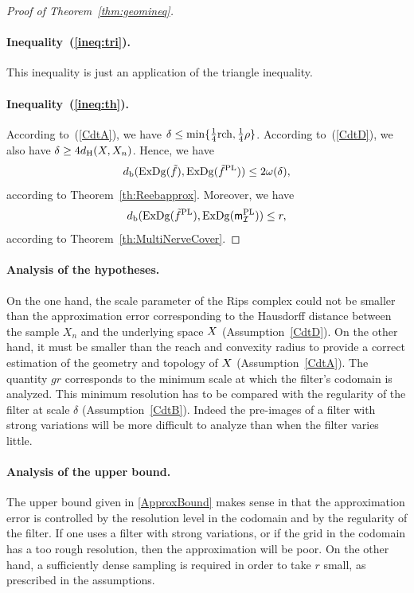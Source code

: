 \begin{proof}[Proof of Theorem~\ref{thm:geomineq}]
\paragraph*{Inequality~(\ref{ineq:tri}).}
This inequality is just an application of the triangle inequality.

\paragraph*{Inequality~(\ref{ineq:th}).}
According to~(\ref{CdtA}), we have %
$\delta \leq \min\{\frac 14 {\rm rch},\frac 14 \rho\}$. 
According to~(\ref{CdtD}), we also have $\delta\geq 4 d_{\rm H}(X,X_n)$.
Hence, we have 
$$d_{\rm b}(\mathrm{ExDg}(\tilde{f}),\mathrm{ExDg}({\tilde{f}}^{\rm PL}))\leq 2 \omega(\delta),$$ %
according to Theorem~\ref{th:Reebapprox}.
Moreover, we have 
$$\dper(  \Dg( \frips{\freeb{f}} ), %
\Dg( \fRPLMtel ) )\leq r,$$ %
according to Theorem~\ref{th:MultiNerveCover}.

\end{proof}

\paragraph{Analysis of the hypotheses.}
On the one hand, the scale parameter of the Rips complex could not be smaller than the approximation error corresponding to 
the Hausdorff distance between the sample $X_n$ and the underlying space $X$ (Assumption~\eqref{CdtD}). 
On the other hand, it must be smaller than the reach and convexity radius to provide a correct estimation of 
the geometry and topology of $X$ (Assumption~\eqref{CdtA}). 
The quantity $g r$ corresponds to the minimum scale at which the filter's codomain is analyzed. This minimum resolution 
has to be compared with the regularity of the filter at scale $\delta$ (Assumption~\eqref{CdtB}). Indeed the pre-images of a filter with 
strong variations will be more difficult to analyze than when the filter varies little. 

\paragraph{Analysis of the upper bound.} The upper bound given in \eqref{ApproxBound} makes sense in that the 
approximation error is controlled by the resolution level in the 
codomain and by the regularity of the filter. If one uses a filter with strong variations, or if the grid in the codomain has a too 
rough resolution, then the approximation will be poor. On the other hand, a sufficiently dense sampling is required in order to take $r$ small, 
as prescribed in the assumptions.

